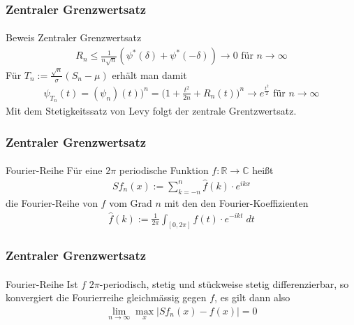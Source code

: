 \documentclass{beamer}
\begin{document}
\begin{frame}
    \frametitle{Zentraler Grenzwertsatz}
\framesubtitle{}

\begin{block}{Beweis Zentraler Grenzwertsatz}
\begin{align*}
R_n \leq \frac{1}{n \sqrt{n}} (\psi^*(\delta)  + \psi^*(-\delta) ) \rightarrow 0  \text{ für } n \to \infty
\end{align*}
Für $T_n := \frac{\sqrt{n}}{\sigma}(S_n - \mu)$ erhält man damit
\begin{align*}
\psi_{T_n}(t) = (\psi_n)(t))^n = \biggl(  1 + \frac{t^2}{2n} + R_n(t) \biggr)^n \rightarrow e^{\frac{t^2}{2}} \text{ für } n \to \infty
\end{align*}
Mit dem Stetigkeitssatz von Levy folgt der zentrale Grentzwertsatz.
\end{block}

 \end{frame}



\begin{frame}
    \frametitle{Zentraler Grenzwertsatz}
\framesubtitle{}

\begin{block}{Fourier-Reihe}
Für eine $2\pi$ periodische Funktion $f: \mathbb{R} \to \mathbb{C}$  heißt 
\begin{align*}
Sf_n(x) := \sum_{k= -n}^{n} \hat{f}(k) \cdot e^{ikx} 
\end{align*}
die Fourier-Reihe von $f$ vom Grad $n$ mit den den Fourier-Koeffizienten
\begin{align*}
\hat{f}(k) := \frac{1}{2 \pi} \int_{[0, 2 \pi]} f(t) \cdot e^{-ikt} \; dt
\end{align*}
\end{block}

 \end{frame}


\begin{frame}
    \frametitle{Zentraler Grenzwertsatz}
\framesubtitle{}

\begin{block}{Fourier-Reihe}
Ist $f$  $2\pi$-periodisch,  stetig und stückweise stetig differenzierbar, so konvergiert die Fourierreihe gleichmässig gegen $f$, es gilt dann also 
\begin{align*}
\lim_{n \to \infty} \max_x |Sf_n(x) -f(x) | = 0
\end{align*}
\end{block}

 \end{frame}
\end{document}
